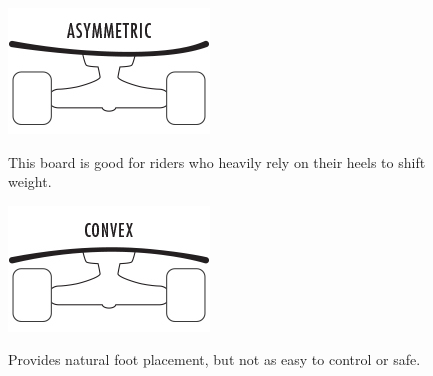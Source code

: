 \documentclass[titlepage, letterpaper,12pt]{article}
\begin{document}
\begin{itemize}
\begin{figure}[!htbp]\centering
\begin{minipage}{.5\textwidth}\centering
\includegraphics[width=.8\textwidth]{asymmetric.jpg}
\label{asymmetric}
\end{minipage}
\item This board is good for riders who heavily rely on their heels to shift weight.
\end{figure}

\begin{figure}[!htbp]\centering
\begin{minipage}{.5\textwidth}\centering
\includegraphics[width=.8\textwidth]{convex.jpg}
\label{convex}
\end{minipage}
\item Provides natural foot placement, but not as easy to control or safe.
\end{figure}


\end{itemize}
\end{document}
